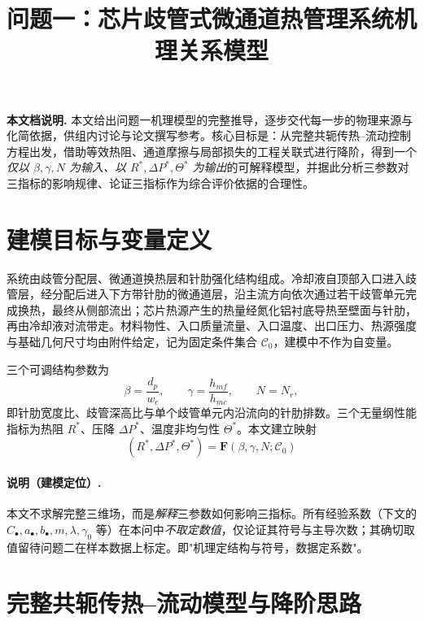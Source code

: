 \documentclass[UTF8,a4paper,12pt]{ctexart}
\title{问题一：芯片歧管式微通道热管理系统机理关系模型\\}
\author{}
\date{}
\numberwithin{equation}{section}
\begin{document}
\maketitle

\noindent\textbf{本文档说明.} 本文给出问题一机理模型的完整推导，逐步交代每一步的物理来源与化简依据，供组内讨论与论文撰写参考。核心目标是：从完整共轭传热--流动控制方程出发，借助等效热阻、通道摩擦与局部损失的工程关联式进行降阶，得到一个\emph{仅以 $\beta,\gamma,N$ 为输入、以 $R^*,\Delta P^*,\Theta^*$ 为输出}的可解释模型，并据此分析三参数对三指标的影响规律、论证三指标作为综合评价依据的合理性。

\section{建模目标与变量定义}

系统由歧管分配层、微通道换热层和针肋强化结构组成。冷却液自顶部入口进入歧管层，经分配后进入下方带针肋的微通道层，沿主流方向依次通过若干歧管单元完成换热，最终从侧部流出；芯片热源产生的热量经氮化铝衬底导热至壁面与针肋，再由冷却液对流带走。材料物性、入口质量流量、入口温度、出口压力、热源强度与基础几何尺寸均由附件给定，记为固定条件集合 $\mathcal C_0$，建模中不作为自变量。

三个可调结构参数为
\begin{equation}
    \beta=\frac{d_p}{w_c},\qquad \gamma=\frac{h_{mf}}{h_{mc}},\qquad N=N_r,
\end{equation}
即针肋宽度比、歧管深高比与单个歧管单元内沿流向的针肋排数。三个无量纲性能指标为热阻 $R^*$、压降 $\Delta P^*$、温度非均匀性 $\Theta^*$。本文建立映射
\begin{equation}
    \boxed{\;(R^*,\Delta P^*,\Theta^*)=\mathbf F(\beta,\gamma,N;\mathcal C_0)\;}
\end{equation}

\paragraph{说明（建模定位）.}本文不求解完整三维场，而是\emph{解释}三参数如何影响三指标。所有经验系数（下文的 $C_\bullet,a_\bullet,b_\bullet,m,\lambda,\gamma_0$ 等）在本问中\emph{不取定数值}，仅论证其符号与主导次数；其确切取值留待问题二在样本数据上标定。即"机理定结构与符号，数据定系数"。

\section{完整共轭传热--流动模型与降阶思路}
\end{document}
